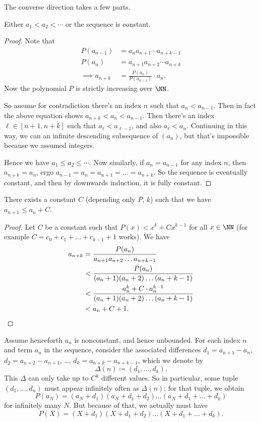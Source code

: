 \documentclass[11pt]{scrartcl}
\begin{document}
The converse direction takes a few parts.
\begin{claim*}
  Either $a_1 < a_2 < \dotsb$ or the sequence is constant.
\end{claim*}
\begin{proof}
  Note that
  \begin{align*}
    P(a_{n-1}) &= a_{n}a_{n+1}\dotsm a_{n+k-1} \\
    P(a_n) &= a_{n+1}a_{n+2}\dotsm a_{n+k} \\
    \implies a_{n+k} &= \frac{P(a_n)}{P(a_{n-1})} \cdot a_n.
  \end{align*}
  Now the polynomial $P$ is strictly increasing over $\NN$.

  So assume for contradiction there's an index $n$ such that $a_n < a_{n-1}$.
  Then in fact the above equation shows $a_{n+k} < a_n < a_{n-1}$.
  Then there's an index $\ell \in [n+1,n+k]$ such that
  $a_\ell < a_{\ell-1}$, and also $a_\ell < a_n$.
  Continuing in this way, we can an infinite descending subsequence of $(a_n)$,
  but that's impossible because we assumed integers.

  Hence we have $a_1 \le a_2 \le \dotsb$.
  Now similarly, if $a_n = a_{n-1}$ for any index $n$, then $a_{n+k} = a_n$,
  ergo $a_{n-1} = a_n = a_{n+1} = \dots = a_{n+k}$.
  So the sequence is eventually constant, and then by downwards induction,
  it is fully constant.
\end{proof}

\begin{claim*}
  There exists a constant $C$ (depending only $P$, $k$)
  such that we have $a_{n+1} \leq a_n + C$.
\end{claim*}
\begin{proof}
  Let $C$ be a constant such that $P(x) < x^k + Cx^{k-1}$ for all $x \in \NN$
  (for example $C = c_0 + c_1 + \dots + c_{k-1} + 1$ works).
  We have
  \begin{align*}
    a_{n+k} &= \frac{P(a_n)}{a_{n+1} a_{n+2} \dots a_{n+k-1}} \\
        &< \frac{P(a_n)}{(a_n+1)(a_n+2)\dots(a_n+k-1)} \\
        &< \frac{a_n^k + C \cdot a_n^{k-1}}{(a_n+1)(a_n+2)\dots(a_n+k-1)} \\
        &< a_n + C + 1. \qedhere
  \end{align*}
\end{proof}

Assume henceforth $a_n$ is nonconstant, and hence unbounded.
For each index $n$ and term $a_n$ in the sequence,
consider the associated differences
$d_1 = a_{n+1} - a_n$, $d_2 = a_{n+2} - a_{n+1}$, \dots, $d_k = a_{n+k}-a_{n+k-1}$,
which we denote by
\[ \Delta(n) \coloneqq (d_1, \dots, d_k).\]
This $\Delta$ can only take up to $C^k$ different values.
So in particular, some tuple $(d_1, \dots, d_n)$
must appear infinitely often as $\Delta(n)$; for that tuple, we obtain
\[ P(a_N) = (a_N+d_1)(a_N+d_1+d_2) \dots (a_N+d_1+\dots+d_k) \]
for infinitely many $N$.
But because of that, we actually must have
\[ P(X) = (X+d_1)(X+d_1+d_2) \dots (X+d_1+\dots+d_k). \]
\end{document}

